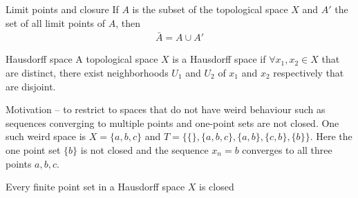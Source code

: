 \documentclass[titlepage, 12pt]{book}
\begin{document}
\begin{theorem}{Limit points and closure}{}
    If $A$ is the subset of the topological space $X$ and $A'$ the set of all
    limit points of $A$, then
    \begin{align*}
        \bar{A} = A\cup A'
    \end{align*}
\end{theorem}

\begin{definition}{Hausdorff space}{}
    A topological space $X$ is a Hausdorff space if $\forall x_1, x_2\in X$ that
    are distinct, there exist neighborhoods $U_1$ and $U_2$ of $x_1$ and $x_2$
    respectively that are disjoint.
\end{definition}
Motivation -- to restrict to spaces that do not have weird behaviour such as
sequences converging to multiple points and one-point sets are not closed. One
such weird space is $X = \{a, b, c\}$ and $T = \{\{\}, \{a, b, c\}, \{a, b\},
\{c, b\}, \{b\}\}$. Here the one point set $\{b\}$ is not closed and the
sequence $x_n = b$ converges to all three points $a, b, c$.

\begin{theorem}{Every finite point set in a Hausdorff space $X$ is closed}{}

\end{theorem}
\end{document}
